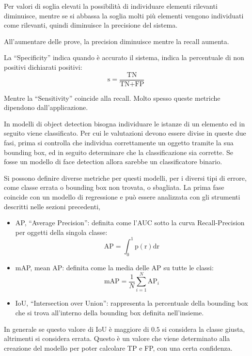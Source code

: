 \documentclass{article}
\numberwithin{equation}{subsection}
\begin{document}
Per valori di soglia elevati la possibilità di individuare elementi rilevanti diminuisce, mentre se si abbassa la soglia molti più elementi vengono individuati come rilevanti, quindi 
diminuisce la precisione del sistema. 

All'aumentare delle prove, la precision diminuisce mentre la recall aumenta. 

La ``Specificity'' indica quando è accurato il sistema, indica la percentuale di non 
positivi dichiarati positivi:
\begin{equation}
    \text{s}=\displaystyle\frac{\text{TN}}{\text{TN}+\text{FP}}
\end{equation}

Mentre la ``Sensitivity'' coincide alla recall. 
Molto spesso queste metriche dipendono dall'applicazione. 

In modelli di object detection bisogna individuare le istanze di un elemento ed in seguito 
viene classificato. Per cui le valutazioni devono essere divise in queste due fasi, prima si controlla che individua correttamente un oggetto tramite la sua bounding box, ed in seguito determinare che la classificazione sia corrette. 
Se fosse un modello di face detection allora sarebbe un classificatore binario. 

Si possono definire diverse metriche per questi modelli, per i diversi tipi di errore, come 
classe errata o bounding box non trovata, o sbagliata. La prima fase coincide con un modello di regressione e può essere analizzata con gli strumenti descritti nelle sezioni precedenti, 
\begin{itemize}
    \item AP, ``Average Precision'': definita come l'AUC sotto la curva Recall-Precision per oggetti della singola classe:
    \begin{equation}
        \text{AP}=\displaystyle\int_0^1\text{p}(\text{r})\text{dr}
    \end{equation}
    \item mAP, mean AP: definita come la media delle AP su tutte le classi:
    \begin{equation}
        \text{mAP}=\displaystyle\frac{1}{N}\sum_{i=1}^N\text{AP}_i
    \end{equation}
    \item IoU, ``Intersection over Union'': rappresenta la percentuale della bounding box che si trova all'interno della bounding box definita nell'insieme.  
\end{itemize}

In generale se questo valore di IoU è maggiore di $0.5$ si considera la classe giusta, altrimenti si considera errata. Questo è un valore che viene determinato alla creazione del modello per poter calcolare TP e FP, con una certa confidenza. 
\end{document}
